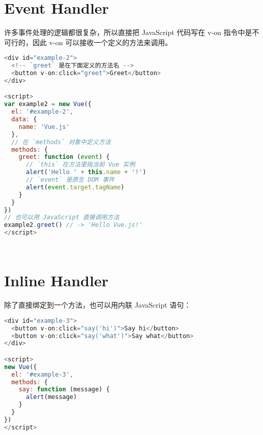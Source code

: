 \begin{lstlisting}[language=JavaScript]

\end{lstlisting}



\begin{lstlisting}[language=JavaScript]

\end{lstlisting}

\section{Event Handler}

许多事件处理的逻辑都很复杂，所以直接把 JavaScript 代码写在 v-on 指令中是不可行的，因此 v-on 可以接收一个定义的方法来调用。

\begin{lstlisting}[language=JavaScript]
<div id="example-2">
  <!-- `greet` 是在下面定义的方法名 -->
  <button v-on:click="greet">Greet</button>
</div>

<script>
var example2 = new Vue({
  el: '#example-2',
  data: {
    name: 'Vue.js'
  },
  // 在 `methods` 对象中定义方法
  methods: {
    greet: function (event) {
      // `this` 在方法里指当前 Vue 实例
      alert('Hello ' + this.name + '!')
      // `event` 是原生 DOM 事件
      alert(event.target.tagName)
    }
  }
})
// 也可以用 JavaScript 直接调用方法
example2.greet() // -> 'Hello Vue.js!'
</script>
\end{lstlisting}



\begin{lstlisting}[language=JavaScript]

\end{lstlisting}



\begin{lstlisting}[language=JavaScript]

\end{lstlisting}


\section{Inline Handler}

除了直接绑定到一个方法，也可以用内联 JavaScript 语句：

\begin{lstlisting}[language=JavaScript]
<div id="example-3">
  <button v-on:click="say('hi')">Say hi</button>
  <button v-on:click="say('what')">Say what</button>
</div>

<script>
new Vue({
  el: '#example-3',
  methods: {
    say: function (message) {
      alert(message)
    }
  }
})
</script>
\end{lstlisting}


